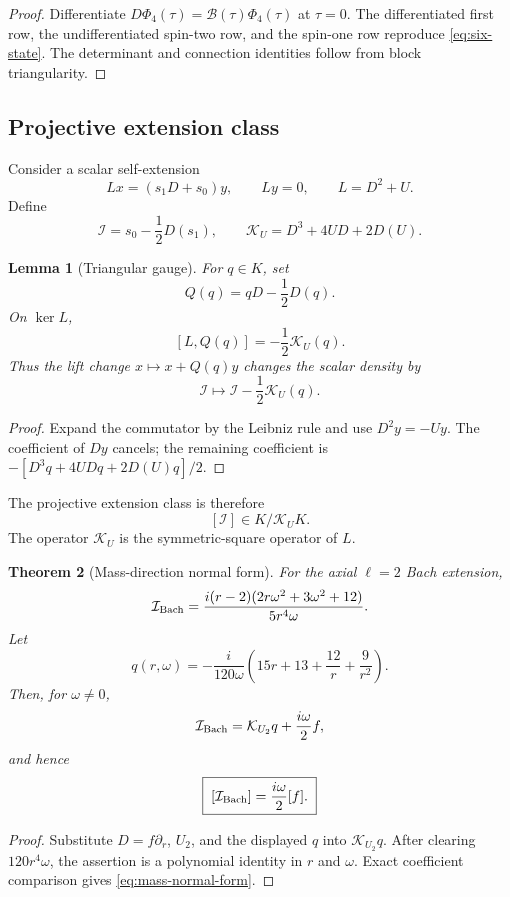 \documentclass[11pt]{article}
\newtheorem{theorem}{Theorem}[section]
\newtheorem{lemma}[theorem]{Lemma}
\theoremstyle{remark}
\begin{document}
\begin{proof}
Differentiate
\(D\Phi_4(\tau)=\mathcal B(\tau)\Phi_4(\tau)\) at \(\tau=0\).
The differentiated first row, the undifferentiated spin-two row, and the
spin-one row reproduce \eqref{eq:six-state}.  The determinant and
connection identities follow from block triangularity.
\end{proof}

\subsection{Projective extension class}

Consider a scalar self-extension
\[
 Lx=(s_1D+s_0)y,\qquad Ly=0,\qquad L=D^2+U.
\]
Define
\[
 \mathcal I=s_0-\frac12D(s_1),\qquad
 \mathcal K_U=D^3+4UD+2D(U).
\]

\begin{lemma}[Triangular gauge]\label{lem:triangular-gauge}
For \(q\in K\), set
\[
 Q(q)=qD-\frac12D(q).
\]
On \(\ker L\),
\[
 [L,Q(q)]=-\frac12\mathcal K_U(q).
\]
Thus the lift change \(x\mapsto x+Q(q)y\) changes the scalar density by
\[
 \mathcal I\longmapsto
 \mathcal I-\frac12\mathcal K_U(q).
\]
\end{lemma}

\begin{proof}
Expand the commutator by the Leibniz rule and use \(D^2y=-Uy\).
The coefficient of \(Dy\) cancels; the remaining coefficient is
\(-[D^3q+4UDq+2D(U)q]/2\).
\end{proof}

The projective extension class is therefore
\[
 [\mathcal I]\in K/\mathcal K_UK.
\]
The operator \(\mathcal K_U\) is the symmetric-square operator of \(L\).

\begin{theorem}[Mass-direction normal form]\label{thm:mass-normal}
For the axial \(\ell=2\) Bach extension,
\[
 \mathcal I_{\rm Bach}
 =
 \frac{i(r-2)(2r\omega^2+3\omega^2+12)}
 {5r^4\omega}.
\]
Let
\[
 q(r,\omega)=
 -\frac{i}{120\omega}
 \left(15r+13+\frac{12}{r}+\frac9{r^2}\right).
\]
Then, for \(\omega\ne0\),
\begin{equation}\label{eq:mass-normal-form}
 \mathcal I_{\rm Bach}
 =\mathcal K_{U_2}q+\frac{i\omega}{2}f,
\end{equation}
and hence
\[
 \boxed{\;
 [\mathcal I_{\rm Bach}]
 =\frac{i\omega}{2}[f].
 \;}
\]
\end{theorem}

\begin{proof}
Substitute \(D=f\partial_r\), \(U_2\), and the displayed \(q\) into
\(\mathcal K_{U_2}q\).  After clearing \(120r^4\omega\), the assertion is
a polynomial identity in \(r\) and \(\omega\).  Exact coefficient
comparison gives \eqref{eq:mass-normal-form}.
\end{proof}
\end{document}
